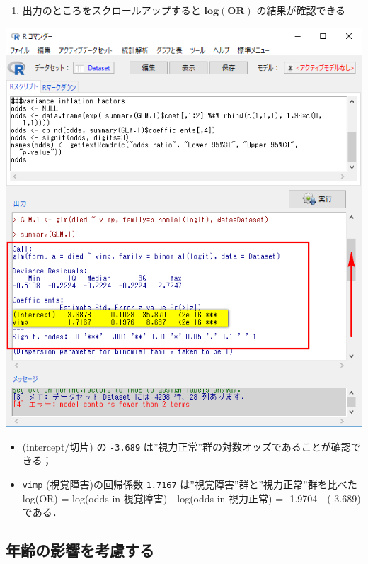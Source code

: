 \documentclass[11pt,]{problemset}
\providecommand{\tightlist}{%
  \setlength{\itemsep}{0pt}\setlength{\parskip}{0pt}}
\begin{document}
\begin{enumerate}
\def\labelenumi{\arabic{enumi}.}
\setcounter{enumi}{9}
\tightlist
\item
  出力のところをスクロールアップすると \(\mathbf{log(OR)}\)
  の結果が確認できる
\end{enumerate}

\begin{center}\includegraphics[width=0.52\linewidth]{pic/logstic09} \end{center}

\begin{itemize}
\tightlist
\item
  (intercept/切片) の \texttt{-3.689}
  は''視力正常''群の対数オッズであることが確認できる；
\item
  \texttt{vimp} (視覚障害)の回帰係数 \texttt{1.7167}
  は''視覚障害''群と''視力正常''群を比べた log(OR) = log(odds in
  視覚障害) - log(odds in 視力正常) = -1.9704 - (-3.689)である．
\end{itemize}

\subsection{年齢の影響を考慮する}
\end{document}
